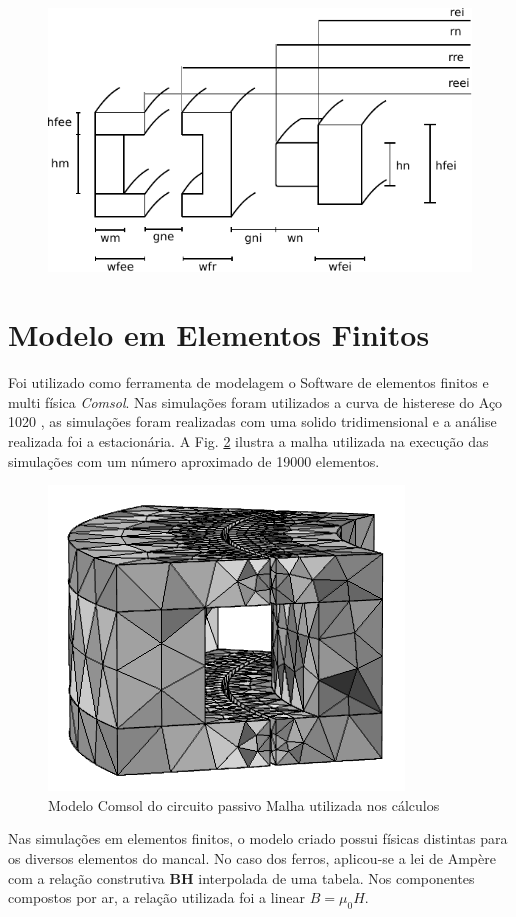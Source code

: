 \begin{figure}[th!]
	\centering
	\includegraphics[width=0.8\linewidth]{Figs/modelo_dimensoes}
	\caption{}
	\label{fig:modelo_dimensoes}
\end{figure}

 \section{Modelo em Elementos Finitos}
 
 Foi utilizado como ferramenta de modelagem o Software de elementos finitos e multi física \textit{Comsol}. Nas simulações foram utilizados a curva de histerese do Aço 1020 , as simulações foram realizadas com uma solido tridimensional e a análise realizada foi a estacionária.  A Fig. \ref{Fig:Simulacao:Passivo:Mesh} ilustra a malha utilizada na execução das simulações com um número aproximado de 19000 elementos.
 
 \begin{figure}[!ht]
 	\centering
 	\includegraphics[width=0.5 \columnwidth,angle=0]{Figs/Simulacoes/Passivo/3D_Mesh=1,2.png}
 	\caption{Modelo Comsol do circuito passivo Malha utilizada nos cálculos}
 	\label{Fig:Simulacao:Passivo:Mesh}
 \end{figure}
 
Nas simulações em elementos finitos, o modelo criado possui físicas distintas para os diversos elementos do mancal. No caso dos ferros, aplicou-se a lei de Ampère com a relação construtiva \textbf{BH} interpolada de uma tabela. Nos componentes compostos por ar, a relação utilizada foi a linear $B=\mu_0 H$. 

